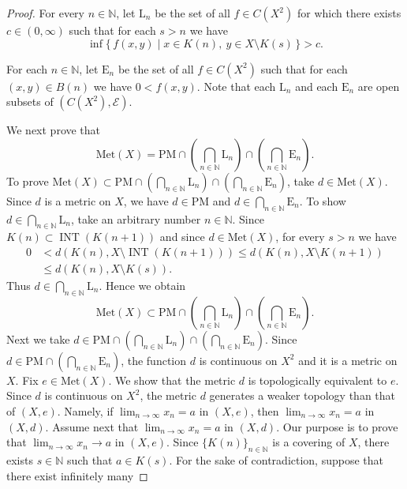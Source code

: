 \documentclass[a4paper, 12pt]{amsart}
\theoremstyle{plain}
\theoremstyle{definition}
\theoremstyle{remark}
\newcommand{\nn}{\mathbb{N}}
\DeclareMathOperator{\nai}{INT}
\newcommand{\met}[1]{\mathrm{Met}(#1)}
\newcommand{\yopset}{\mathrm{PM}}
\newcommand{\yolset}[1]{\mathrm{L}_{#1}}
\newcommand{\yoeset}[1]{\mathrm{E}_{#1}}
\newcommand{\yodset}[1]{B(#1)}
\newcommand{\yokset}[1]{K(#1)}
\begin{document}
\begin{proof}
For every 
$n\in \nn$,  
let
 $\yolset{n}$ 
be the set of all 
$f\in C(X^{2})$ 
for which 
there exists
$c\in (0, \infty)$ 
such that 
for each  
$s>n$ 
we have 
\[
\inf\{\, f(x, y)\mid x\in \yokset{n}, \  y\in X\setminus \yokset{s}\, \} >c. 
\]

For each 
$n\in \nn$,  
let 
$\yoeset{n}$ 
be 
the set of all 
$f\in C(X^{2})$ 
such that
for each 
$(x, y)\in \yodset{n}$ 
we have 
$0<f(x, y)$.  
Note that each 
$\yolset{n}$ 
and each 
$\yoeset{n}$ 
are open subsets 
of 
$(C(X^{2}), \mathcal{E})$. 

We next prove that
\[
	\met{X}=
	\yopset
	\cap 
	\left(
	\bigcap_{n\in \nn} \yolset{n}
	\right)
	\cap  
	\left(
	\bigcap_{n\in \nn}\yoeset{n}
	\right). 
\]
To prove
$\met{X}\subset
	\yopset
	\cap 
	\left(
	\bigcap_{n\in \nn} \yolset{n}
	\right)
	\cap  
	\left(
	\bigcap_{n\in \nn}\yoeset{n}
	\right)$, 
take 
$d\in \met{X}$. 
Since 
$d$
 is a metric on 
 $X$, 
we have
 $d\in \yopset$ 
and  
$d\in \bigcap_{n\in \nn}\yoeset{n}$. 
To show 
$d\in \bigcap_{n\in \nn}\yolset{n}$,  
take an arbitrary number 
$n\in \nn$. 
Since 
$\yokset{n}\subset \nai(\yokset{n+1})$ 
and 
since 
$d\in \met{X}$, 
for every 
$s> n$ 
we have 
\begin{align*}
	0&<d(\yokset{n}, X\setminus \nai(\yokset{n+1}))
	\le
	d(\yokset{n}, X\setminus \yokset{n+1})
	\\
	&\le
	d(\yokset{n}, X\setminus \yokset{s}).
\end{align*}
Thus  
$d\in \bigcap_{n\in \nn}\yolset{n}$. 
Hence we obtain
\[
	\met{X}
	\subset 
	\yopset
	\cap 
	\left(
	\bigcap_{n\in \nn} \yolset{n}
	\right)
	\cap
	\left(
	\bigcap_{n\in \nn}\yoeset{n}
	\right). 
\]
Next we  take 
$d\in \yopset\cap \left(\bigcap_{n\in \nn} \yolset{n}\right)\cap  \left(\bigcap_{n\in \nn}\yoeset{n}\right)$. 
Since 
$d\in \yopset\cap \left( \bigcap_{n\in \nn}\yoeset{n}\right)$, 
the function 
$d$ 
is  continuous on 
$X^{2}$ 
and it is  a metric on 
$X$. 
Fix 
$e\in \met{X}$. 
We show that  
the metric  
$d$ 
is topologically equivalent to
 $e$. 
Since 
$d$ 
is continuous on 
 $X^{2}$, 
the metric
 $d$ 
 generates a weaker topology than that of
  $(X, e)$. 
Namely, 
if 
$\lim_{n\to \infty}x_{n}= a$ 
in 
$(X, e)$, 
then 
$\lim_{n\to \infty}x_{n}=a$ 
in 
$(X, d)$. 
Assume next  that 
$\lim_{n\to \infty}x_{n}= a$
 in 
 $(X, d)$. 
Our purpose is 
to prove 
that 
$\lim_{n\to \infty}x_{n}\to a$
in 
$(X, e)$. 
Since 
$\{\yokset{n}\}_{n\in \nn}$ 
is a covering of 
$X$, 
there exists 
$s\in \nn$
such that 
$a\in \yokset{s}$. 
For the sake of contradiction, 
suppose that 
there exist infinitely many 

\end{proof}
\end{document}

